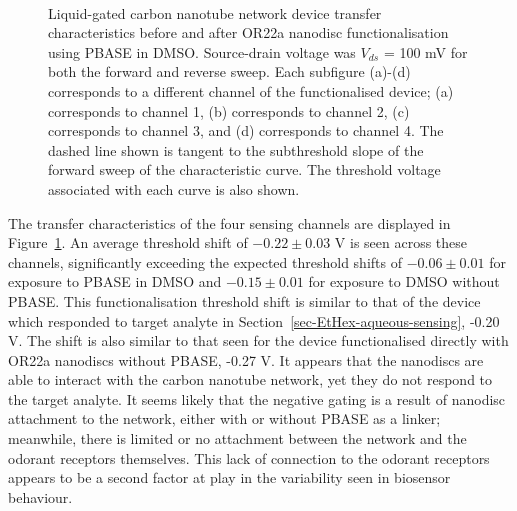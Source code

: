 \documentclass[
  a4paper,
]{scrbook}
\begin{document}
\begin{figure}
\begin{minipage}[t]{0.45\linewidth}
{{}

}

\end{minipage}%
%
\begin{minipage}[t]{0.01\linewidth}

{\centering 

~

}

\end{minipage}%

\caption[Liquid-gated carbon nanotube network device transfer
characteristics before and after OR22a nanodisc functionalisation using
PBASE in DMSO, with threshold voltage corresponding to each transfer
curve also shown.]{\label{fig-DMSO-TX}Liquid-gated carbon nanotube
network device transfer characteristics before and after OR22a nanodisc
functionalisation using PBASE in DMSO. Source-drain voltage was
\(V_{ds}\) = 100 mV for both the forward and reverse sweep. Each
subfigure (a)-(d) corresponds to a different channel of the
functionalised device; (a) corresponds to channel 1, (b) corresponds to
channel 2, (c) corresponds to channel 3, and (d) corresponds to channel
4. The dashed line shown is tangent to the subthreshold slope of the
forward sweep of the characteristic curve. The threshold voltage
associated with each curve is also shown.}

\end{figure}

The transfer characteristics of the four sensing channels are displayed
in Figure~\ref{fig-DMSO-TX}. An average threshold shift of
\(-0.22\pm0.03\) V is seen across these channels, significantly
exceeding the expected threshold shifts of \(-0.06\pm0.01\) for exposure
to PBASE in DMSO and \(-0.15\pm0.01\) for exposure to DMSO without
PBASE. This functionalisation threshold shift is similar to that of the
device which responded to target analyte in
Section~\ref{sec-EtHex-aqueous-sensing}, -0.20 V. The shift is also
similar to that seen for the device functionalised directly with OR22a
nanodiscs without PBASE, -0.27 V. It appears that the nanodiscs are able
to interact with the carbon nanotube network, yet they do not respond to
the target analyte. It seems likely that the negative gating is a result
of nanodisc attachment to the network, either with or without PBASE as a
linker; meanwhile, there is limited or no attachment between the network
and the odorant receptors themselves. This lack of connection to the
odorant receptors appears to be a second factor at play in the
variability seen in biosensor behaviour.
\end{document}
